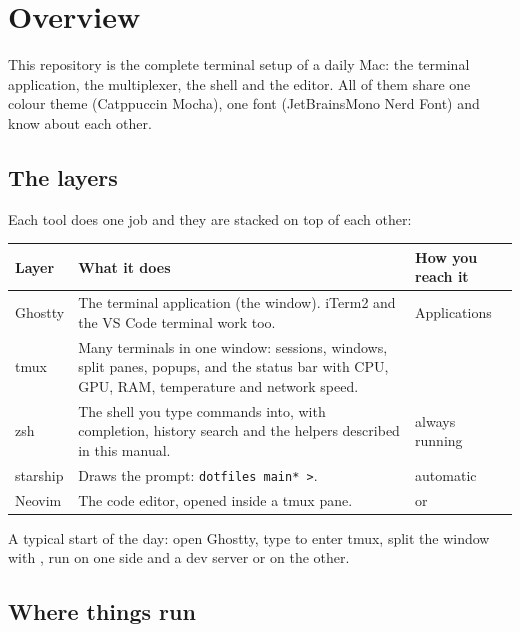 \chapter{Overview}\label{ch:overview}

This repository is the complete terminal setup of a daily Mac: the terminal application, the
multiplexer, the shell and the editor. All of them share one colour theme (Catppuccin Mocha), one
font (JetBrainsMono Nerd Font) and know about each other.


\section{The layers}

Each tool does one job and they are stacked on top of each other:

\begin{center}\small
\begin{tabularx}{\linewidth}{@{}l L l@{}}
\toprule
\sffamily\bfseries Layer & \sffamily\bfseries What it does & \sffamily\bfseries How you reach it\\
\midrule
Ghostty  & The terminal application (the window). iTerm2 and the VS Code terminal work too. & Applications \\
tmux     & Many terminals in one window: sessions, windows, split panes, popups, and the status bar with CPU, GPU, RAM, temperature and network speed. &  \\
zsh      & The shell you type commands into, with completion, history search and the helpers described in this manual. & always running \\
starship & Draws the prompt: \texttt{dotfiles main* >}. & automatic \\
Neovim   & The code editor, opened inside a tmux pane. &  or  \\
\bottomrule
\end{tabularx}
\end{center}

A typical start of the day: open Ghostty, type  to enter tmux, split the window with
, run  on one side and a dev server or  on the other.

\section{Where things run}

